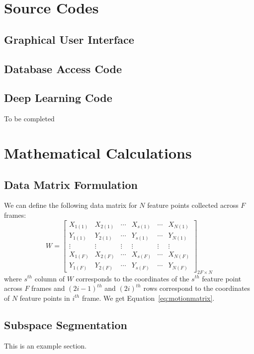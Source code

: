 \documentclass[12pt,letterpaper,oneside,reqno]{book}
\theoremstyle{plain}
\theoremstyle{definition}
\theoremstyle{plain}
\theoremstyle{remark}
\theoremstyle{plain}
\theoremstyle{definition}
\theoremstyle{plain}
\begin{document}
\begin{appendices}
\chapter{Source Codes}
\section{Graphical User Interface}


\section{Database Access Code}


\section{Deep Learning Code}
To be completed

\chapter{Mathematical Calculations}
\section{Data Matrix Formulation}
We can  define the following data matrix for $N$ feature points collected across $F$ frames:
\begin{equation}
W = \left[ \begin{matrix} 
		 X_{1(1)} & X_{2(1)} & \dotsb & X_{s(1)} & \dotsb & X_{N(1)}\\
		 Y_{1(1)} & Y_{2(1)} & \dotsb & Y_{s(1)} & \dotsb & Y_{N(1)}\\
		 \vdots &  \vdots & \vdots & \vdots & \vdots & \vdots \\
		 X_{1(F)} & X_{2(F)} & \dotsb & X_{s(F)} & \dotsb & X_{N(F)}\\
		 Y_{1(F)} & Y_{2(F)} & \dotsb & Y_{s(F)} & \dotsb & Y_{N(F)}
\end{matrix} \right]_{2F\times N}
\label{eq:motionmatrix}
\end{equation}
where $s^{th}$ column of $W$ corresponds to the coordinates of the $s^{th}$ feature point across $F$ frames and $(2i-1)^{th}$ and $(2i)^{th}$ rows correspond to the coordinates of $N$ feature points in $i^{th}$ frame. We get Equation~\eqref{eq:motionmatrix}.
\section{Subspace Segmentation}
This is an example section.
\end{appendices}




\backmatter

\cleardoublepage
\printbibliography[heading=bibintoc,title={References}]
\end{document}

